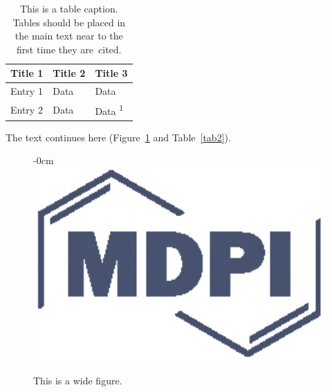 \documentclass[sustainability,article,submit,pdftex,moreauthors]{Definitions/mdpi}
\begin{document}
\begin{table}[H] 
\caption{This is a table caption. Tables should be placed in the main text near to the first time they are~cited.\label{tab1}}
\begin{tabularx}{\textwidth}{CCC}
\toprule
\textbf{Title 1}	& \textbf{Title 2}	& \textbf{Title 3}\\
\midrule
Entry 1		& Data			& Data\\
Entry 2		& Data			& Data \textsuperscript{1}\\
\bottomrule
\end{tabularx}
\end{table}

The text continues here (Figure~\ref{fig2} and Table~\ref{tab2}).

\begin{figure}[H]
\begin{adjustwidth}{-\extralength}{0cm}
\centering
\includegraphics[width=15.5cm]{Definitions/logo-mdpi}
\end{adjustwidth}
\caption{This is a wide figure.\label{fig2}}
\end{figure}  
\end{document}
